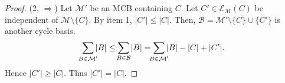 \documentclass[10pt,a4paper]{amsart}
\newcommand\calB{\mathcal{B}}
\newcommand\calM{\mathcal{M}}
\newcommand\expand[2]{\mathcal{E}_{#1}\left(#2\right)}   %
\begin{document}
\begin{proof}
	(2, $\Rightarrow$) 
		Let $\calM'$ be an MCB containing $C$. 
		Let $C'\in\expand{\calM}{C}$ be independent of $\calM\setminus\{C\}$. By item 1, $|C'|\le |C|$. 
		Then, $\calB=\calM'\setminus\{C\}\cup\{C'\}$ is another cycle basis.
		\begin{equation}
			\sum_{\mathclap{B\in\calM'}} |B| \le \sum_{\mathclap{B\in\calB}} |B| = \sum_{\mathclap{B\in\calM'}} |B| - |C| + |C'|.
		\end{equation}
		Hence $|C'|\ge|C|$. Thus $|C'|=|C|$.
%	
%	
%	 
\end{proof}
\end{document}
